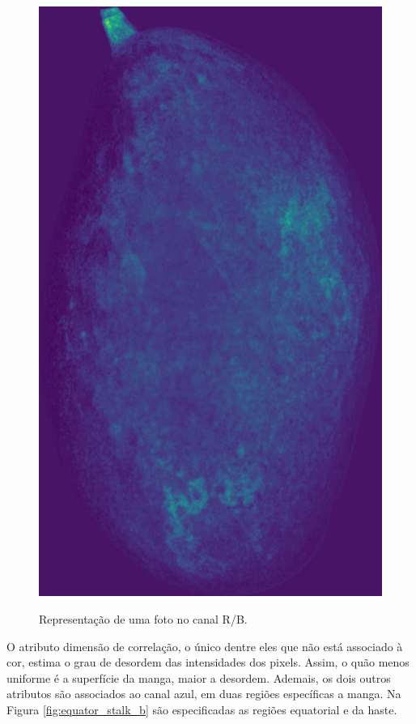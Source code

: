 \begin{figure}[H]
\centering
	\caption{Representação de uma foto no canal R/B.}
	\includegraphics[scale=0.05]{img/RB_rate_img.jpg}
	\label{fig:rbrate_fig}
\end{figure}

O atributo dimensão de correlação, o único dentre eles que não está associado à cor, estima o grau de desordem das intensidades dos pixels. Assim, o quão menos uniforme é a superfície da manga, maior a desordem. Ademais, os dois outros atributos são associados ao canal azul, em duas regiões específicas a manga. Na Figura \ref{fig:equator_stalk_b} são especificadas as regiões equatorial e da haste.

